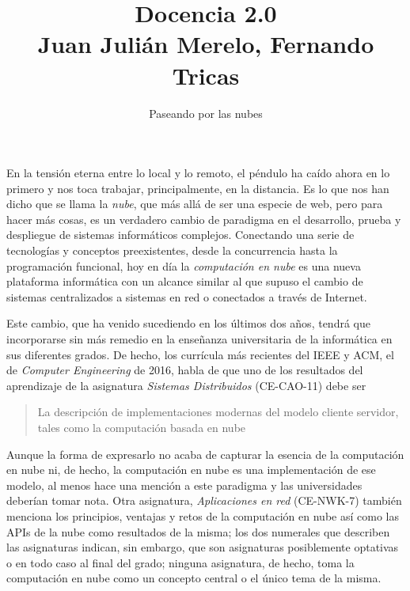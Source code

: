 \documentclass[twoside,10pt]{article}
\title{Docencia 2.0\\ \large Juan Juli\'an Merelo, Fernando 
Tricas}
\author{\LARGE Paseando por las nubes}
\date{}
\newcounter{num}
\begin{document}
\addtocounter{page}{2}

\maketitle
\vspace*{-8ex}

\begin{multicols}{2}

  En la tensi\'on eterna entre lo local y lo remoto,
  el p\'endulo ha ca\'ido ahora en lo primero
  y nos toca trabajar,
  principalmente, en la distancia. Es lo que nos han dicho que se
  llama la {\em nube}, que m\'as all\'a de ser una especie de web, pero para hacer
  m\'as cosas, es un verdadero cambio de paradigma en el desarrollo,
  prueba y despliegue de sistemas inform\'aticos complejos. Conectando
  una serie de tecnolog\'ias y conceptos preexistentes, desde la
  concurrencia hasta la programaci\'on funcional, hoy en d\'ia la {\em
    computaci\'on en nube} es una nueva plataforma inform\'atica con un
  alcance similar al que supuso el cambio de sistemas centralizados a
  sistemas en red o conectados a trav\'es de Internet.

Este cambio, que ha venido sucediendo en los \'ultimos dos a\~nos, tendr\'a
que incorporarse sin m\'as remedio en la ense\~nanza universitaria de la
inform\'atica en sus diferentes grados. De hecho, los curr\'icula m\'as
recientes del IEEE y ACM, el de {\em Computer Engineering} de 2016, habla de
que uno de los resultados del aprendizaje de la asignatura {\em Sistemas
Distribuidos} (CE-CAO-11)
 debe ser 

\begin{quote}
  La descripci\'on de implementaciones modernas del modelo cliente
  servidor, tales como la computaci\'on basada en nube
\end{quote}
Aunque la forma de expresarlo no acaba de capturar la esencia de la
computaci\'on en nube ni, de hecho, la computaci\'on en nube es una
implementaci\'on de ese modelo, al menos hace una menci\'on a este
paradigma y las universidades deber\'ian tomar nota. Otra asignatura,
{\em Aplicaciones en red} (CE-NWK-7) tambi\'en menciona los principios,
ventajas y retos de la computaci\'on en nube as\'i como las APIs de la
nube como resultados de la misma; los dos numerales que describen las
asignaturas indican, sin embargo, que son asignaturas posiblemente
optativas o en todo caso al final del grado; ninguna asignatura, de
hecho, toma la computaci\'on en nube como un concepto central o el \'unico
tema de la misma. 


\end{multicols}
\end{document}
